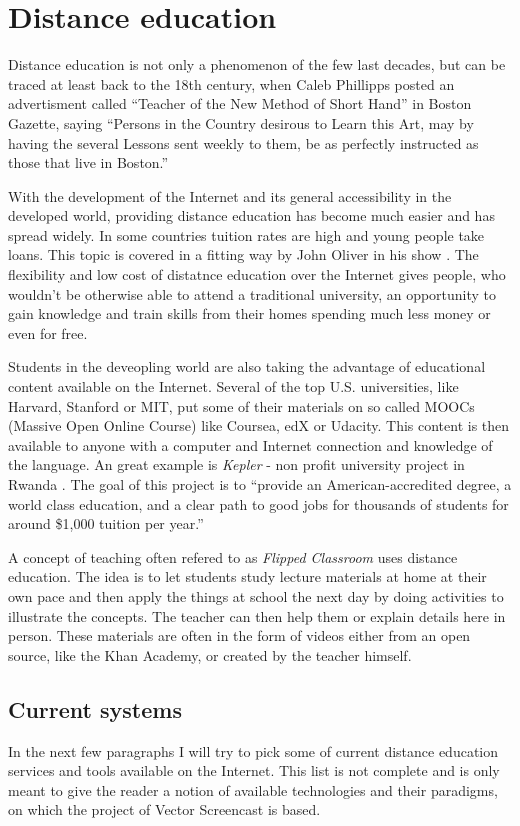 \chapter{Distance education}

Distance education is not only a phenomenon of the few last decades, but can be traced at least back to the 18th century, when Caleb Phillipps posted an advertisment called ``Teacher of the New Method of Short Hand'' in Boston Gazette, saying ``Persons in the Country desirous to Learn this Art, may by having the several Lessons sent weekly to them, be as perfectly instructed as those that live in Boston.'' \cite{1}

With the development of the Internet and its general accessibility in the developed world, providing distance education has become much easier and has spread widely. In some countries tuition rates are high and young people take loans. This topic is covered in a fitting way by John Oliver in his show \cite{2}. The flexibility and low cost of distatnce education over the Internet gives people, who wouldn't be otherwise able to attend a traditional university, an opportunity to gain knowledge and train skills from their homes \cite{3} spending much less money or even for free.

Students in the deveopling world are also taking the advantage of educational content available on the Internet. Several of the top U.S. universities, like Harvard, Stanford or MIT, put some of their materials on so called MOOCs (Massive Open Online Course) like Coursea, edX or Udacity. This content is then available to anyone with a computer and Internet connection and knowledge of the language. An great example is \textit{Kepler} - non profit university project in Rwanda \cite{5}. The goal of this project is to ``provide an American-accredited degree, a world class education, and a clear path to good jobs for thousands of students for around \$1,000 tuition per year.'' \cite{6}

A concept of teaching often refered to as \textit{Flipped Classroom} uses distance education. The idea is to let students study lecture materials at home at their own pace and then apply the things at school the next day by doing activities to illustrate the concepts. The teacher can then help them or explain details here in person. These materials are often in the form of videos either from an open source, like the Khan Academy, or created by the teacher himself.

\section{Current systems}
In the next few paragraphs I will try to pick some of current distance education services and tools available on the Internet. This list is not complete and is only meant to give the reader a notion of available technologies and their paradigms, on which the project of Vector Screencast is based.

